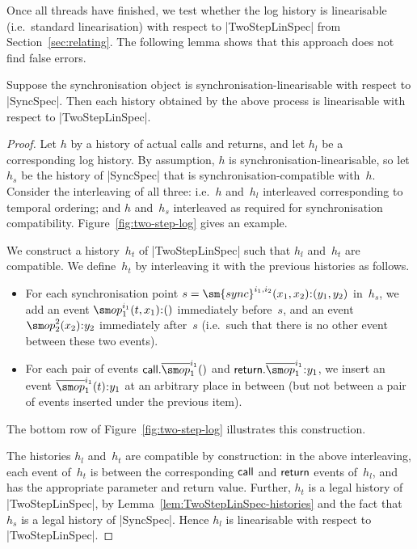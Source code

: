 Once all threads have finished, we test whether the log history is
linearisable (i.e.~standard linearisation) with respect to |TwoStepLinSpec|
from Section~\ref{sec:relating}.
%
The following lemma shows that this approach does not find false errors.
%
\begin{lemma}
\label{lem:two-step-testing}
Suppose the synchronisation object is synchronisation-lin\-ear\-is\-able with
respect to |SyncSpec|.  Then each history obtained by the above process is
linearisable with respect to |TwoStepLinSpec|.
\end{lemma}


\begin{proof}
Let $h$ by a history of actual calls and returns, and let $h_l$ be a
corresponding log history.  By assumption, $h$ is
synchronisation-linearisable, so let $h_s$ be the history of |SyncSpec| that
is synchronisation-compatible with~$h$.  Consider the interleaving of all
three: i.e.~$h$ and~$h_l$ interleaved corresponding to temporal ordering; and
$h$ and~$h_s$ interleaved as required for synchronisation compatibility.
Figure~\ref{fig:two-step-log} gives an example.

We construct a history~$h_t$ of |TwoStepLinSpec| such that $h_l$ and~$h_t$ are
compatible.  We define~$h_t$ by interleaving it with the previous
histories as follows. 
\begin{itemize}
\item For each synchronisation point $s =
  \sm{sync}^{i_1,i_2}(x_1,x_2)\::(y_1,y_2)$ in~$h_s$, we add an event
  $\op_1^{i_1}(t,x_1)\::()$ immediately before~$s$, and an event
  $\op_2^2(x_2)\::y_2$ immediately after~$s$ (i.e.~such that there is no
  other event between these two events).

\item For each pair of events $\call.\overline\op_1^{i_1}()$ and
  $\return.\overline\op_1^{i_1}\::y_1$, we insert an event
  $\overline\op_1^{i_1}(t)\::y_1$ at an arbitrary place in between (but not
  between a pair of events inserted under the previous item).
\end{itemize}
%
The bottom row of Figure~\ref{fig:two-step-log} illustrates this construction.

The histories $h_l$ and~$h_t$ are compatible by construction: in the above
interleaving, each event of~$h_t$ is between the corresponding $\mathsf{call}$ and
$\mathsf{return}$ events of~$h_l$, and has the appropriate parameter and return value.
%
Further, $h_t$ is a legal history of |TwoStepLinSpec|, by
Lemma~\ref{lem:TwoStepLinSpec-histories} and the fact that $h_s$ is a legal
history of |SyncSpec|.
%
Hence $h_l$ is linearisable with respect to |TwoStepLinSpec|.
\end{proof}

